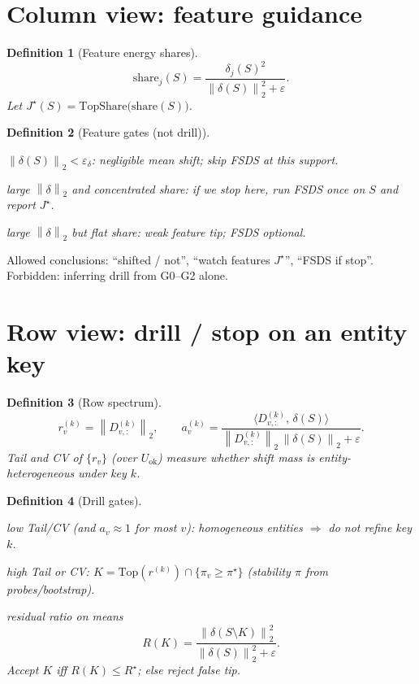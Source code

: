 \documentclass[11pt]{article}
\newtheorem{definition}{Definition}
\newcommand{\norm}[1]{\left\|#1\right\|_2}
\begin{document}
\section{Column view: feature guidance}
\label{sec:cols}

\begin{definition}[Feature energy shares]
\[
  \mathrm{share}_j(S)
  =\frac{\delta_j(S)^2}{\norm{\delta(S)}^2+\varepsilon}.
\]
Let \(J^\star(S)=\mathrm{TopShare}\bigl(\mathrm{share}(S)\bigr)\).
\end{definition}

\begin{definition}[Feature gates (not drill)]
\begin{description}[leftmargin=2.2em]
  \item[G0] \(\norm{\delta(S)}<\varepsilon_\delta\):
    negligible mean shift; skip FSDS at this support.
  \item[G1] large \(\norm{\delta}\) and concentrated share:
    if we \emph{stop} here, run FSDS once on \(S\) and report \(J^\star\).
  \item[G2] large \(\norm{\delta}\) but flat share:
    weak feature tip; FSDS optional.
\end{description}
\end{definition}

\noindent
Allowed conclusions: ``shifted / not'', ``watch features \(J^\star\)'',
``FSDS if stop''. Forbidden: inferring drill from G0--G2 alone.

\section{Row view: drill / stop on an entity key}
\label{sec:rows}

\begin{definition}[Row spectrum]
\[
  r_v^{(k)}
  =\norm{D^{(k)}_{v,:}},
  \qquad
  a_v^{(k)}
  =\frac{\langle D^{(k)}_{v,:},\,\delta(S)\rangle}
        {\norm{D^{(k)}_{v,:}}\,\norm{\delta(S)}+\varepsilon}.
\]
Tail and CV of \(\{r_v\}\) (over \(U_{\mathrm{ok}}\)) measure whether
shift mass is entity-heterogeneous under key \(k\).
\end{definition}

\begin{definition}[Drill gates]
\begin{description}[leftmargin=2.8em]
  \item[D-stop] low Tail/CV (and \(a_v\approx 1\) for most \(v\)):
    homogeneous entities \(\Rightarrow\) do not refine key \(k\).
  \item[D-drill] high Tail or CV:
    \(K=\mathrm{Top}(r^{(k)})\cap\{\pi_v\ge\pi^\star\}\)
    (stability \(\pi\) from probes/bootstrap).
  \item[D-check]
    residual ratio on means
    \[
      R(K)
      =\frac{\norm{\delta(S\setminus K)}^2}{\norm{\delta(S)}^2+\varepsilon}.
    \]
    Accept \(K\) iff \(R(K)\le R^\star\); else reject false tip.
\end{description}
\end{definition}
\end{document}
